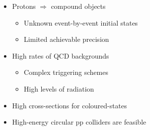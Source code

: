 \begin{frame}
\begin{columns}[t]
    \centering
  \end{columns}

  \vspace{-0.3cm}

  \begin{columns}[t]

    \begin{itemize}
    \item Protons $\Rightarrow$ compound objects
      \begin{itemize}
      \item Unknown event-by-event initial states
      \item Limited achievable precision
      \end{itemize}
    \item High rates of QCD backgrounds
      \begin{itemize}
      \item Complex triggering schemes
      \item High levels of radiation
      \end{itemize}
    \item High cross-sections for coloured-states
    \item High-energy circular pp colliders are feasible
    \end{itemize}


\end{columns}
\end{frame}
